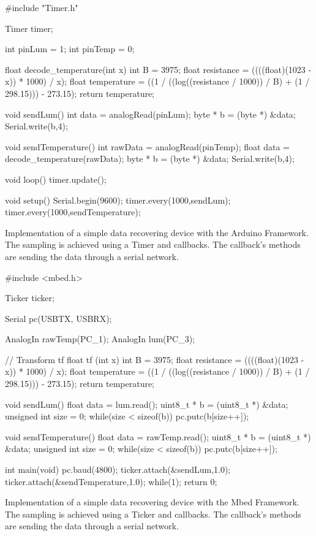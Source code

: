 \begin{listing}[H]
  \centering
\begin{scalacode}
#include "Timer.h"

Timer timer;

int pinLum = 1;
int pinTemp = 0;

float decode_temperature(int x){
  int B = 3975;
  float resistance = ((((float)(1023 - x)) * 1000) / x);
  float temperature = ((1 / ((log((resistance / 1000)) / B) + (1 / 298.15))) - 273.15);
  return temperature;
}

void sendLum(){
  int data = analogRead(pinLum);
  byte * b = (byte *) &data;
  Serial.write(b,4);
}

void sendTemperature(){
  int rawData = analogRead(pinTemp);
  float data = decode_temperature(rawData);
  byte * b = (byte *) &data;
  Serial.write(b,4);
}

void loop() {
  timer.update();
}

void setup() {
  Serial.begin(9600);
  timer.every(1000,sendLum);
  timer.every(1000,sendTemperature);
}
\end{scalacode}
  \caption[Arduino code for a simple data recovering]{Implementation of a simple
data recovering device with the Arduino Framework. The sampling is achieved
using a Timer and callbacks. The callback's methods are sending the data through a
serial network.}
  \label{lst:arduino_generalisation}
\end{listing}

\begin{listing}[H]
  \centering
\begin{scalacode}
#include <mbed.h>

Ticker ticker;

Serial pc(USBTX, USBRX);

AnalogIn rawTemp(PC_1);
AnalogIn lum(PC_3);

 // Transform tf
float tf (int x){
  int B = 3975;
  float resistance = ((((float)(1023 - x)) * 1000) / x);
  float temperature = ((1 / ((log((resistance / 1000)) / B) + (1 / 298.15))) - 273.15);
  return temperature;
}

void sendLum(){
  float data = lum.read();
  uint8_t * b = (uint8_t *) &data;
  unsigned int size = 0;
  while(size < sizeof(b)) {
      pc.putc(b[size++]);
  }
}

void sendTemperature(){
  float data = rawTemp.read();
  uint8_t * b = (uint8_t *) &data;
  unsigned int size = 0;
  while(size < sizeof(b)) {
    pc.putc(b[size++]);
  }
}

int main(void) {
  pc.baud(4800);
  ticker.attach(&sendLum,1.0);
  ticker.attach(&sendTemperature,1.0);
  while(1);
  return 0;
}
\end{scalacode}
  \caption[Mbed code for a simple data recovering]{Implementation of a simple
data recovering device with the Mbed Framework. The sampling is achieved
using a Ticker and callbacks. The callback's methods are sending the data through a
serial network.}
  \label{lst:mbed_generalisation}
\end{listing}

